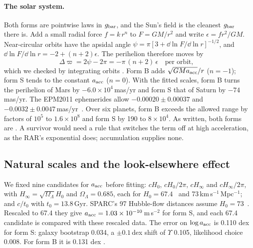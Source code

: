 \paragraph{The solar system.} Both forms are pointwise laws in $g_{\rm bar}$, and the Sun's field is the cleanest $g_{\rm bar}$ there is. Add a
small radial force $f=k\,r^n$ to $F=GM/r^2$ and write $\epsilon=fr^2/GM$. Near-circular orbits have the apsidal angle
$\psi=\pi[3+\dd\ln F/\dd\ln r]^{-1/2}$, and $\dd\ln F/\dd\ln r=-2+(n+2)\epsilon$. The perihelion therefore moves by
\begin{equation}\label{eq:precession}
\Delta\varpi=2\psi-2\pi=-\pi\,(n+2)\,\epsilon\quad\text{per orbit},
\end{equation}
which we checked by integrating orbits . Form B adds $\sqrt{GMa_{\rm acc}}/r$ ($n=-1$); form S tends to the constant
$a_{\rm acc}$ ($n=0$). With the fitted scales, form B turns the perihelion of Mars by $-6.0\times10^4$\,mas/yr and form S that of Saturn by
$-74$\,mas/yr. The EPM2011 ephemerides allow $-0.00020\pm0.00037$ and $-0.0032\pm0.0047$\,mas/yr~\cite{pitjeva2013}. Over six planets,
form B exceeds the allowed range by factors of $10^5$ to $1.6\times10^8$ and form S by 190 to $8\times10^4$. As written, both forms are
. A survivor would need a rule that switches the term off at high acceleration, as the RAR's exponential does; accumulation
supplies none.

\subsection{Natural scales and the look-elsewhere effect}\label{sec:remnant-scales}

We fixed nine candidates for $a_{\rm acc}$ before fitting: $cH_0$, $cH_0/2\pi$, $cH_\infty$ and $cH_\infty/2\pi$, with
$H_\infty=\sqrt{\Omega_\Lambda}H_0$ and $\Omega_\Lambda=0.685$, each for $H_0=67.4$~\cite{planck18} and 73\,km\,s$^{-1}$\,Mpc$^{-1}$; and $c/t_0$
with $t_0=13.8$\,Gyr. SPARC's 97 Hubble-flow distances assume $H_0=73$~\cite{lelli2016}. Rescaled to 67.4 they give
$a_{\rm acc}=1.03\times10^{-10}$\,m\,s$^{-2}$ for form S, and each 67.4 candidate is compared with these rescaled data. The error on
$\log a_{\rm acc}$ is 0.110 dex for form S: galaxy bootstrap 0.034, a $\pm0.1$\,dex shift of $\Upsilon$ 0.105, likelihood choice 0.008. For
form B it is 0.131 dex .

